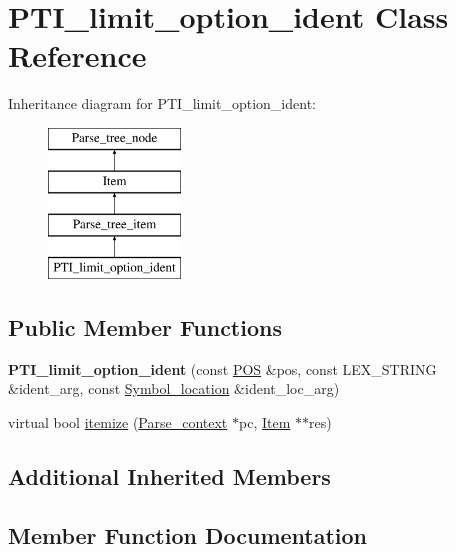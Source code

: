 \hypertarget{classPTI__limit__option__ident}{}\section{P\+T\+I\+\_\+limit\+\_\+option\+\_\+ident Class Reference}
\label{classPTI__limit__option__ident}
Inheritance diagram for P\+T\+I\+\_\+limit\+\_\+option\+\_\+ident\+:\begin{figure}[H]
\begin{center}
\leavevmode
\includegraphics[height=4.000000cm]{classPTI__limit__option__ident}
\end{center}
\end{figure}
\subsection*{Public Member Functions}
\begin{DoxyCompactItemize}
\item 
\mbox{\label{classPTI__limit__option__ident_aa6b2c026976dc56192bbce96eaf8b78e}} 
{\bfseries P\+T\+I\+\_\+limit\+\_\+option\+\_\+ident} (const \mbox{\hyperlink{structYYLTYPE}{P\+OS}} \&pos, const L\+E\+X\+\_\+\+S\+T\+R\+I\+NG \&ident\+\_\+arg, const \mbox{\hyperlink{structSymbol__location}{Symbol\+\_\+location}} \&ident\+\_\+loc\+\_\+arg)
\item 
virtual bool \mbox{\hyperlink{classPTI__limit__option__ident_aed5d55bb68f0a47c7c841fe480ac3cf0}{itemize}} (\mbox{\hyperlink{structParse__context}{Parse\+\_\+context}} $\ast$pc, \mbox{\hyperlink{classItem}{Item}} $\ast$$\ast$res)
\end{DoxyCompactItemize}
\subsection*{Additional Inherited Members}


\subsection{Member Function Documentation}
\mbox{\label{classPTI__limit__option__ident_aed5d55bb68f0a47c7c841fe480ac3cf0}} 
